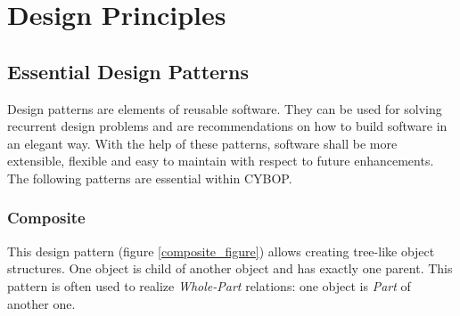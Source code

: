 %
%
%
%
%
%
%

\section{Design Principles}
\label{design_principles_heading}

\subsection{Essential Design Patterns}
\label{essential_design_patterns_heading}

Design patterns \cite{gamma1995} are elements of reusable software. They can be
used for solving recurrent design problems and are recommendations on how to build
software in an elegant way. With the help of these patterns, software shall be
more extensible, flexible and easy to maintain with respect to future enhancements.
The following patterns are essential within CYBOP.

\subsubsection{Composite}
\label{composite_heading}

This design pattern (figure \ref{composite_figure}) allows creating tree-like
object structures. One object is child of another object and has exactly one
parent. This pattern is often used to realize \emph{Whole-Part} relations:
one object is \emph{Part} of another one.

